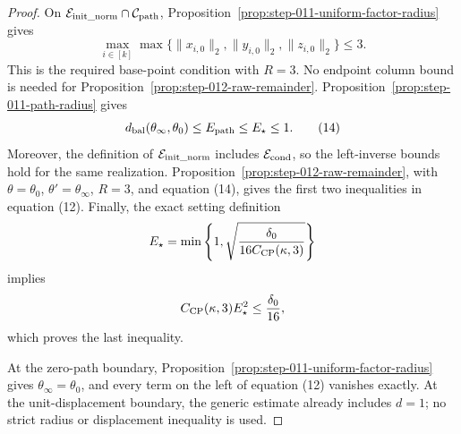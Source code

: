 \begin{proof}
On
\(\mathcal E_{\rm init\_norm}\cap\mathcal C_{\rm path}\), Proposition~\ref{prop:step-011-uniform-factor-radius} gives
\[
  \max_{i\in[k]}
  \max\{\|x_{i,0}\|_2,\|y_{i,0}\|_2,\|z_{i,0}\|_2\}
  \le3.                                                    \tag{13}
\]
This is the required base-point condition with \(R=3\). No endpoint column
bound is needed for Proposition~\ref{prop:step-012-raw-remainder}.
Proposition~\ref{prop:step-011-path-radius} gives
\[
  d_{\rm bal}(\theta_\infty,\theta_0)
  \le E_{\rm path}\le E_\star\le1.                       \tag{14}
\]
Moreover, the definition of \(\mathcal E_{\rm init\_norm}\) includes
\(\mathcal E_{\rm cond}\), so the left-inverse bounds hold for the
same realization. Proposition~\ref{prop:step-012-raw-remainder}, with
\(\theta=\theta_0\), \(\theta'=\theta_\infty\), \(R=3\), and equation
(14), gives the first two inequalities in equation (12). Finally, the exact
setting definition
\[
  E_\star
  =\min\left\{1,
       \sqrt{\frac{\delta_0}{16C_{\rm CP}(\kappa,3)}}
    \right\}
\]
implies
\[
  C_{\rm CP}(\kappa,3)E_\star^2\le\frac{\delta_0}{16},
\]
which proves the last inequality.

At the zero-path boundary, Proposition~\ref{prop:step-011-uniform-factor-radius} gives
\(\theta_\infty=\theta_0\), and every term on the left of equation (12)
vanishes exactly. At the unit-displacement boundary, the generic estimate
already includes \(d=1\); no strict radius or displacement inequality is
used. 

\end{proof}

